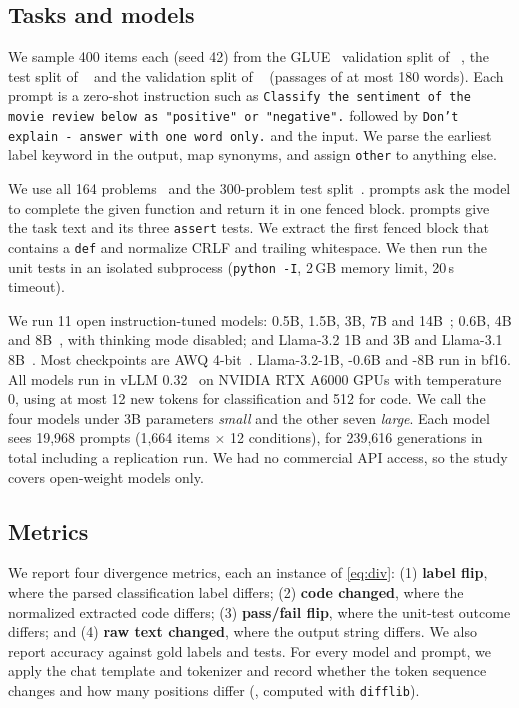 

\subsection{Tasks and models}
We sample 400 items each (seed 42) from the GLUE~\cite{wang2018glue} validation split of \sst~\cite{socher2013recursive}, the test split of \agnews~\cite{zhang2015character} and the validation split of \boolq~\cite{clark2019boolq} (passages of at most 180 words).
Each prompt is a zero-shot instruction such as \texttt{Classify the sentiment of the movie review below as "positive" or "negative".} followed by \texttt{Don't explain - answer with one word only.} and the input.
We parse the earliest label keyword in the output, map synonyms, and assign \texttt{other} to anything else.

We use all 164 \humaneval problems~\cite{chen2021evaluating} and the 300-problem \mbpp test split~\cite{austin2021program}.
\humaneval prompts ask the model to complete the given function and return it in one fenced block. \mbpp prompts give the task text and its three \texttt{assert} tests.
We extract the first fenced block that contains a \texttt{def} and normalize CRLF and trailing whitespace.
We then run the unit tests in an isolated subprocess (\texttt{python -I}, 2\,GB memory limit, 20\,s timeout).

We run 11 open instruction-tuned models: \qwentwo 0.5B, 1.5B, 3B, 7B and 14B~\cite{qwen2025qwen25}; \qwenthree 0.6B, 4B and 8B~\cite{yang2025qwen3}, with thinking mode disabled; and Llama-3.2 1B and 3B and Llama-3.1 8B~\cite{grattafiori2024llama3}.
Most checkpoints are AWQ 4-bit~\cite{lin2024awq}. Llama-3.2-1B, \qwenthree-0.6B and \qwenthree-8B run in bf16.
All models run in vLLM 0.32~\cite{kwon2023efficient} on NVIDIA RTX A6000 GPUs with temperature 0, using at most 12 new tokens for classification and 512 for code.
We call the four models under 3B parameters \emph{small} and the other seven \emph{large}.
Each model sees 19,968 prompts (1,664 items $\times$ 12 conditions), for 239,616 generations in total including a replication run.
We had no commercial API access, so the study covers open-weight models only.

\subsection{Metrics}
We report four divergence metrics, each an instance of \eqref{eq:div}:
(1) \textbf{label flip}, where the parsed classification label differs;
(2) \textbf{code changed}, where the normalized extracted code differs;
(3) \textbf{pass/fail flip}, where the unit-test outcome differs; and
(4) \textbf{raw text changed}, where the output string differs.
We also report accuracy against gold labels and tests.
For every model and prompt, we apply the chat template and tokenizer and record whether the token sequence changes and how many positions differ (\dtok, computed with \texttt{difflib}).

